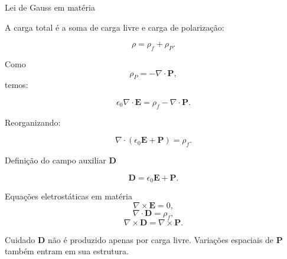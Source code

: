 \documentclass[aspectratio=169]{beamer}
\begin{document}
\begin{frame}{Lei de Gauss em matéria}

\small

A carga total é a soma de carga livre e carga de polarização:

\[
\rho=\rho_f+\rho_P.
\]

Como
\[
\rho_P=-\nabla\cdot\mathbf P,
\]
temos:

\begin{eqbox}
\begin{equation}
\epsilon_0\nabla\cdot\mathbf E
=
\rho_f-\nabla\cdot\mathbf P.
\tag{6.24}
\label{eq:gauss-materia}
\end{equation}
\end{eqbox}

Reorganizando:

\[
\nabla\cdot(\epsilon_0\mathbf E+\mathbf P)=\rho_f.
\]

\end{frame}

\begin{frame}{Definição do campo auxiliar \(\mathbf D\)}

\begin{eqbox}
\begin{equation}
\mathbf D
=
\epsilon_0\mathbf E+\mathbf P.
\tag{6.25}
\label{eq:D-def}
\end{equation}
\end{eqbox}

\begin{mybox}{Equações eletrostáticas em matéria}
\[
\nabla\times\mathbf E=0,
\tag{6.26}
\]
\[
\nabla\cdot\mathbf D=\rho_f,
\tag{6.27}
\]
\[
\nabla\times\mathbf D=\nabla\times\mathbf P.
\tag{6.28}
\]
\end{mybox}

\begin{alertblock}{Cuidado}
\(\mathbf D\) não é produzido apenas por carga livre. Variações espaciais de
\(\mathbf P\) também entram em sua estrutura.
\end{alertblock}

\end{frame}
\end{document}
